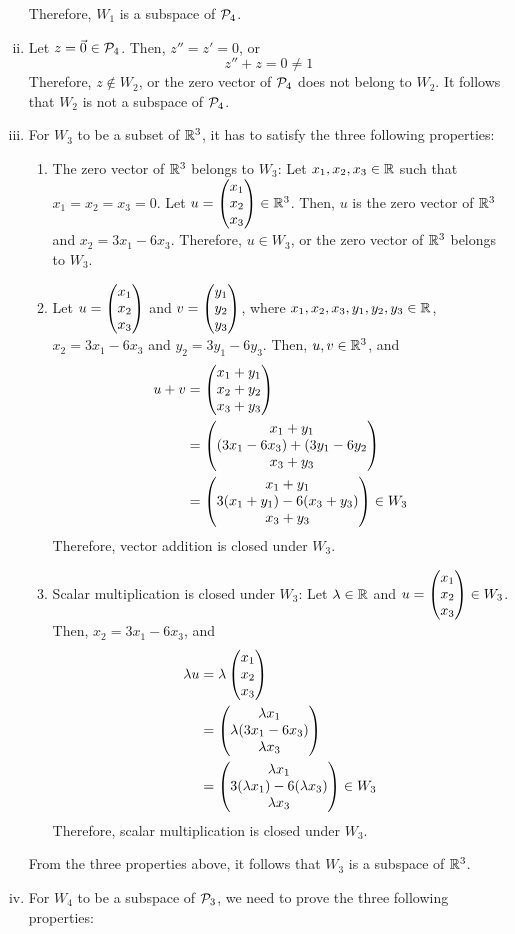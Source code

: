 \begin{sol}
\begin{enumerate}[(i)]
\begin{enumerate}[(1)]
    \end{enumerate}
    Therefore, $W_1$ is a subspace of $\P_4$.
    \item Let $z=\Vec{0}\in\P_4$. Then, $z''=z'=0$, or
    \[
        z''+z=0\not=1
    \]
    Therefore, $z\not\in W_2$, or the zero vector of $\P_4$ does not belong to $W_2$. It follows that $W_2$ is not a subspace of $\P_4$.
    \item For $W_3$ to be a subset of $\R^{3}$, it has to satisfy the three following properties:
    \begin{enumerate}[(1)]
        \item The zero vector of $\R^{3}$ belongs to $W_3$: Let $x_1,x_2,x_3\in\R$ such that $x_1=x_2=x_3=0$. Let $u=\colvecthree{x_1}{x_2}{x_3}\in\R^{3}$. Then, $u$ is the zero vector of $\R^{3}$ and $x_2=3x_1-6x_3$. Therefore, $u\in W_3$, or the zero vector of $\R^{3}$ belongs to $W_3$.
        \item Let $u=\colvecthree{x_1}{x_2}{x_3}$ and $v=\colvecthree{y_1}{y_2}{y_3}$, where $x_1,x_2,x_3,y_1,y_2,y_3\in\R$, $x_2=3x_1-6x_3$ and $y_2=3y_1-6y_3$. Then, $u,v\in\R^{3}$, and
        \[
            \begin{aligned}
                u+v &= \colvecthree{x_1+y_1}{x_2+y_2}{x_3+y_3}\\
                    &= \colvecthree{x_1+y_1}{(3x_1-6x_3)+(3y_1-6y_2}{x_3+y_3}\\
                    &= \colvecthree{x_1+y_1}{3(x_1+y_1)-6(x_3+y_3)}{x_3+y_3}\in W_3
            \end{aligned}
        \]
        Therefore, vector addition is closed under $W_3$.
        \item Scalar multiplication is closed under $W_3$: Let $\lam\in\R$ and $u=\colvecthree{x_1}{x_2}{x_3}\in W_3$. Then, $x_2=3x_1-6x_3$, and
        \[
            \begin{aligned}
                \lam u &= \lam\colvecthree{x_1}{x_2}{x_3}\\
                       &= \colvecthree{\lam x_1}{\lam (3x_1-6x_3)}{\lam x_3}\\
                       &= \colvecthree{\lam x_1}{3(\lam x_1)-6(\lam x_3)}{\lam x_3}\in W_3
            \end{aligned}
        \]
        Therefore, scalar multiplication is closed under $W_3$.
    \end{enumerate}
    From the three properties above, it follows that $W_3$ is a subspace of $\R^{3}$.
    \item For $W_4$ to be a subspace of $\P_3$, we need to prove the three following properties:

\end{enumerate}
\end{sol}
